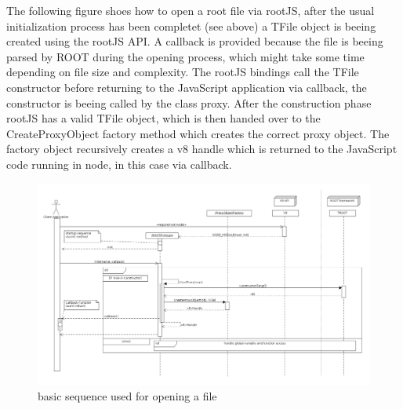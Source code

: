 The following figure shoes how to open a root file via rootJS, after the usual initialization process has been completet (see above) a TFile object is beeing created using the rootJS API. A callback is provided because the file is beeing parsed by ROOT during the opening process, which might take some time depending on file size and complexity. The rootJS bindings call the TFile constructor before returning to the JavaScript application via callback, the constructor is beeing called by the class proxy. After the construction phase rootJS has a valid TFile object, which is then handed over to the CreateProxyObject factory method which creates the correct proxy object. The factory object recursively creates a v8 handle which is returned to the JavaScript code running in node, in this case via callback.
\begin{figure}[htb]
	\centering
	\includegraphics[width=18cm]{./latex/resources/fileOpen.png}
	\caption{basic sequence used for opening a file}
\end{figure}
